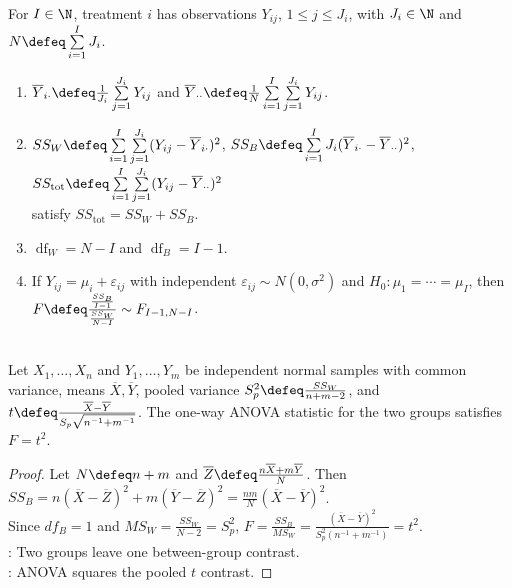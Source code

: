 \begin{method} \label{meth:one-way-anova-unequal-sample-sizes} \\
For $I\in\N$, treatment $i$ has observations $Y_{ij}$, $1\leq j\leq J_i$, with $J_i\in\N$ and $N\defeq\sum\limits_{i=1}^{I}J_i$.
\begin{enumerate}[label=(\roman*)]
\setlength{\itemsep}{0pt}
\item $\overline{Y}_{i\cdot}\defeq \frac{1}{J_i}\sum\limits_{j=1}^{J_i}Y_{ij}$ and $\overline{Y}_{\cdot\cdot}\defeq \frac{1}{N}\sum\limits_{i=1}^{I}\sum\limits_{j=1}^{J_i}Y_{ij}$.
\item $SS_W\defeq\sum\limits_{i=1}^{I}\sum\limits_{j=1}^{J_i}(Y_{ij}-\overline{Y}_{i\cdot})^2$, $SS_B\defeq\sum\limits_{i=1}^{I}J_i(\overline{Y}_{i\cdot}-\overline{Y}_{\cdot\cdot})^2$, $SS_{\mathrm{tot}}\defeq\sum\limits_{i=1}^{I}\sum\limits_{j=1}^{J_i}(Y_{ij}-\overline{Y}_{\cdot\cdot})^2$\\
satisfy $SS_{\mathrm{tot}}=SS_W+SS_B$.
\item $\operatorname{df}_W=N-I$ and $\operatorname{df}_B=I-1$.
\item If $Y_{ij}=\mu_i+\varepsilon_{ij}$ with independent $\varepsilon_{ij}\sim N(0,\sigma^2)$ and $H_0:\mu_1=\cdots=\mu_I$, then $F\defeq \frac{\frac{SS_B}{I-1}}{\frac{SS_W}{N-I}}\sim F_{I-1,N-I}$.
\end{enumerate}
\end{method}

\begin{corollary} \label{cor:two-treatment-one-way-anova-equals-pooled-t} \\
Let $X_1,\ldots,X_n$ and $Y_1,\ldots,Y_m$ be independent normal samples with common variance, means $\overline{X},\overline{Y}$, pooled variance $S_p^2\defeq \frac{SS_W}{n+m-2}$, and $t\defeq\frac{\overline{X}-\overline{Y}}{S_p\sqrt{n^{-1}+m^{-1}}}$. The one-way ANOVA statistic for the two groups satisfies $F=t^2$.
\begin{proof} Let $N\defeq n+m$ and $\overline{Z}\defeq\frac{n\overline{X}+m\overline{Y}}{N}$. Then $SS_B=n(\overline{X}-\overline{Z})^2+m(\overline{Y}-\overline{Z})^2=\frac{nm}{N}(\overline{X}-\overline{Y})^2$.\\
Since $df_B=1$ and $MS_W=\frac{SS_W}{N-2}=S_p^2$, $F=\frac{SS_B}{MS_W}=\frac{(\overline{X}-\overline{Y})^2}{S_p^2(n^{-1}+m^{-1})}=t^2$.\\
: Two groups leave one between-group contrast.\\
: ANOVA squares the pooled $t$ contrast.
\end{proof}
\end{corollary}


